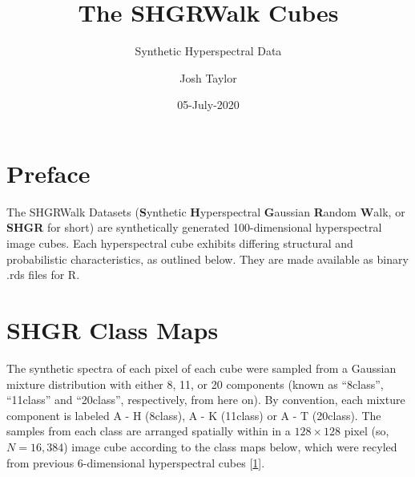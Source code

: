 \documentclass[]{article}
\title{The SHGRWalk Cubes}
\subtitle{Synthetic Hyperspectral Data}
\author{Josh Taylor}
\date{05-July-2020}
\begin{document}
\maketitle

{
\setcounter{tocdepth}{2}
\tableofcontents
}
\hypertarget{preface}{%
\section*{Preface}\label{preface}}

The SHGRWalk Datasets (\textbf{S}ynthetic \textbf{H}yperspectral \textbf{G}aussian \textbf{R}andom \textbf{W}alk, or \textbf{SHGR} for short) are synthetically generated 100-dimensional hyperspectral image cubes. Each hyperspectral cube exhibits differing structural and probabilistic characteristics, as outlined below. They are made available as binary .rds files for R.

\hypertarget{shgr-class-maps}{%
\section{SHGR Class Maps}\label{shgr-class-maps}}

The synthetic spectra of each pixel of each cube were sampled from a Gaussian mixture distribution with either 8, 11, or 20 components (known as ``8class'', ``11class'' and ``20class'', respectively, from here on). By convention, each mixture component is labeled A - H (8class), A - K (11class) or A - T (20class). The samples from each class are arranged spatially within in a \(128 \times 128\) pixel (so, \(N = 16,384\)) image cube according to the class maps below, which were recyled from previous 6-dimensional hyperspectral cubes {[}\protect\hyperlink{ref-MerenyiJainVillmann}{1}{]}.
\end{document}
